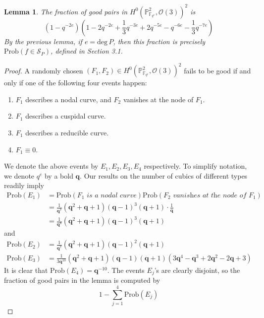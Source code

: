 \documentclass[12pt]{article}
\theoremstyle{plain}
\newtheorem{lemma}[equation]{Lemma}
\theoremstyle{definition}
\newcommand{\IF}{\mathbb{F}}
\newcommand{\IP}{\mathbb{P}}
\newcommand{\sO}{\mathcal{O}}
\newcommand{\sS}{\mathcal{S}}
\renewcommand{\deg}{\mathrm{deg}\,}
\newcommand{\<}{\langle}
\renewcommand{\>}{\rangle}
\newcommand{\Prob}{\mathrm{Prob}}
\begin{document}
\begin{lemma}
\label{prepcount}
The fraction of good pairs in $H^0(\IP^2_{\IF_{q^e}}, \sO(3))^2$ is $$(1 - q^{-2e})(1 - 2q^{-2e} + \frac{1}{3} q^{-3e} + 2 q^{-5e} - q^{-6e} - \frac{1}{3} q^{-7e}) $$ 
By the previous lemma, if $e = \deg P$, then this fraction is precisely $\Prob(f \in \sS_P)$, defined in Section 3.1.
\end{lemma}
\begin{proof}
A randomly chosen $(F_1, F_2) \in H^0(\IP^2_{\IF_{q^e}}, \sO(3))^2$ fails to be good if and only if one of the following four events happen:
\begin{enumerate}
\item $F_1$ describes a nodal curve, and $F_2$ vanishes at the node of $F_1$. 
\item $F_1$ describes a cuspidal curve. 
\item $F_1$ describes a reducible curve. 
\item $F_1 \equiv 0$. 
\end{enumerate} 
We denote the above events by $E_1, E_2, E_3, E_4$ respectively. To simplify notation, we denote $q^e$ by a bold $\pmb{q}$. Our results on the number of cubics of different types readily imply 
\begin{align*}
\Prob(E_1) &= \Prob(F_1 \textit{ is a nodal curve})\Prob(F_2 \textit{ vanishes at the node of } F_1) \\
&= \frac{1}{\pmb{q}^7}(\pmb{q}^2 + \pmb{q} + 1) (\pmb{q} - 1)^3 (\pmb{q} + 1) \cdot \frac{1}{\pmb{q}} \\
&= \frac{1}{\pmb{q}^8}(\pmb{q}^2 + \pmb{q} + 1) (\pmb{q} - 1)^3 (\pmb{q} + 1)
\end{align*}
and 
\begin{align*}
\Prob(E_2) &= \frac{1}{\pmb{q}^7} (\pmb{q}^2 + \pmb{q} + 1) (\pmb{q} - 1)^2 (\pmb{q} + 1)\\
\Prob(E_3) &= \frac{1}{3\pmb{q}^{10}}(\pmb{q}^2 + \pmb{q} + 1)(\pmb{q} - 1) (\pmb{q} + 1)(3\pmb{q}^4 - \pmb{q}^3 + 2 \pmb{q}^2 - 2\pmb{q} + 3)
\end{align*}
It is clear that $\Prob(E_4) = \pmb{q}^{-10}$. The events $E_j$'s are clearly disjoint, so the fraction of good pairs in the lemma is computed by 
$$ 1 - \sum_{j = 1}^4 \Prob(E_j) $$
\end{proof}
\end{document}
